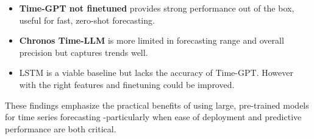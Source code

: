 \documentclass{article}
\begin{document}
\begin{itemize}
    \item \textbf{Time-GPT not finetuned} provides strong performance out of the box, useful for fast, zero-shot forecasting.
\end{itemize}
\begin{itemize}
    \item \textbf{Chronos Time-LLM} is more limited in forecasting range and overall precision but captures trends well.
\end{itemize}
\begin{itemize}
    \item LSTM is a viable baseline but lacks the accuracy of Time-GPT. However with the right features and finetuning could be improved.
\end{itemize}
 
 These findings emphasize the practical benefits of using large, pre-trained models for time series forecasting -particularly when ease of deployment and predictive performance are both critical.
 
\newpage


\nocite{*}
\end{document}
